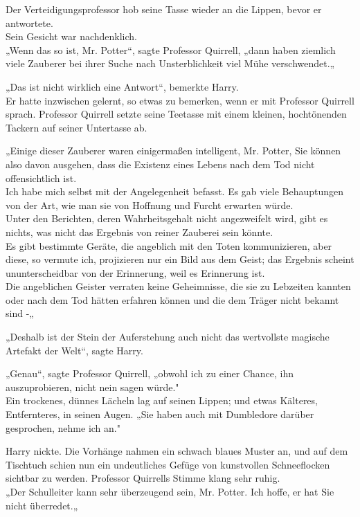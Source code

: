 {Der Verteidigungsprofessor hob seine Tasse wieder an die Lippen, bevor er antwortete.\\ Sein Gesicht war nachdenklich.\\ „Wenn das so ist, Mr. Potter“, sagte Professor Quirrell, „dann haben ziemlich viele Zauberer bei ihrer Suche nach Unsterblichkeit viel Mühe verschwendet.„

„Das ist nicht wirklich eine Antwort“, bemerkte Harry.\\ Er hatte inzwischen gelernt, so etwas zu bemerken, wenn er mit Professor Quirrell sprach. Professor Quirrell setzte seine Teetasse mit einem kleinen, hochtönenden Tackern auf seiner Untertasse ab.

„Einige dieser Zauberer waren einigermaßen intelligent, Mr. Potter, Sie können also davon ausgehen, dass die Existenz eines Lebens nach dem Tod nicht offensichtlich ist.\\ Ich habe mich selbst mit der Angelegenheit befasst. Es gab viele Behauptungen von der Art, wie man sie von Hoffnung und Furcht erwarten würde.\\ Unter den Berichten, deren Wahrheitsgehalt nicht angezweifelt wird, gibt es nichts, was nicht das Ergebnis von reiner Zauberei sein könnte.\\ Es gibt bestimmte Geräte, die angeblich mit den Toten kommunizieren, aber diese, so vermute ich, projizieren nur ein Bild aus dem Geist; das Ergebnis scheint ununterscheidbar von der Erinnerung, weil es Erinnerung ist.\\ Die angeblichen Geister verraten keine Geheimnisse, die sie zu Lebzeiten kannten oder nach dem Tod hätten erfahren können und die dem Träger nicht bekannt sind -„

„Deshalb ist der Stein der Auferstehung auch nicht das wertvollste magische Artefakt der Welt“, sagte Harry.

„Genau“, sagte Professor Quirrell, „obwohl ich zu einer Chance, ihn auszuprobieren, nicht nein sagen würde."\\ Ein trockenes, dünnes Lächeln lag auf seinen Lippen; und etwas Kälteres, Entfernteres, in seinen Augen. „Sie haben auch mit Dumbledore darüber gesprochen, nehme ich an."

Harry nickte. Die Vorhänge nahmen ein schwach blaues Muster an, und auf dem Tischtuch schien nun ein undeutliches Gefüge von kunstvollen Schneeflocken sichtbar zu werden. Professor Quirrells Stimme klang sehr ruhig.\\ „Der Schulleiter kann sehr überzeugend sein, Mr. Potter. Ich hoffe, er hat Sie nicht überredet.„

}
